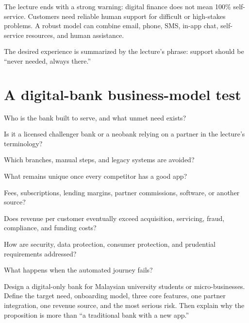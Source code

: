 The lecture ends with a strong warning: digital finance does not mean 100\% self-service. Customers need reliable human support for difficult or high-stakes problems. A robust model can combine email, phone, SMS, in-app chat, self-service resources, and human assistance.

The desired experience is summarized by the lecture's phrase: support should be ``never needed, always there.''

\section{A digital-bank business-model test}

\begin{mlsteps}
  \item {} Who is the bank built to serve, and what unmet need exists?
  \item {} Is it a licensed challenger bank or a neobank relying on a partner in the lecture's terminology?
  \item {} Which branches, manual steps, and legacy systems are avoided?
  \item {} What remains unique once every competitor has a good app?
  \item {} Fees, subscriptions, lending margins, partner commissions, software, or another source?
  \item {} Does revenue per customer eventually exceed acquisition, servicing, fraud, compliance, and funding costs?
  \item {} How are security, data protection, consumer protection, and prudential requirements addressed?
  \item {} What happens when the automated journey fails?
\end{mlsteps}

\begin{tryit}
Design a digital-only bank for Malaysian university students or micro-businesses. Define the target need, onboarding model, three core features, one partner integration, one revenue source, and the most serious risk. Then explain why the proposition is more than ``a traditional bank with a new app.''
\end{tryit}

